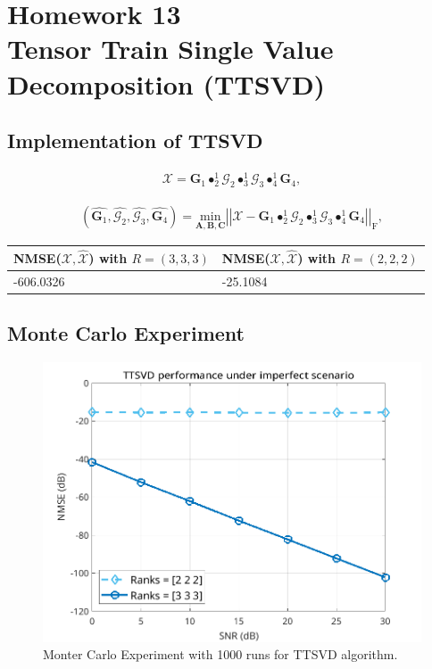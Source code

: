 \documentclass[a4paper,10pt]{article}
\begin{document}
\newpage
\section*{Homework 13 \\ Tensor Train Single Value Decomposition (TTSVD)}

    \subsection*{Implementation of TTSVD}
        
    \begin{align}
        \mathcal{X} = \boldsymbol{G}_{1} \bullet^{1}_{2} \mathcal{G}_{2} \bullet^{1}_{3} \mathcal{G}_{3} \bullet^{1}_{4} \boldsymbol{G}_{4},
    \end{align}

    \begin{align}
        \left(\hat{\boldsymbol{G}_{1}}, \hat{\mathcal{G}_{2}}, \hat{\mathcal{G}_{3}}, \hat{\boldsymbol{G}_{4}}\right) = \underset{\boldsymbol{A}, \boldsymbol{B}, \boldsymbol{C}}{\text{min}} \left| \left| \mathcal{X} - \boldsymbol{G}_{1} \bullet^{1}_{2} \mathcal{G}_{2} \bullet^{1}_{3} \mathcal{G}_{3} \bullet^{1}_{4} \boldsymbol{G}_{4} \right| \right|_{\text{F}},
    \end{align}

    \begin{table}[ht!]
        \centering
        \begin{tabular}{|l|l|}
        \hline
        NMSE($\mathcal{X}, \mathcal{\hat{X}}$) with $R = (3,3,3)$ & NMSE($\mathcal{X}, \mathcal{\hat{X}}$) with $R = (2,2,2)$ \\ \hline 
        -606.0326 & -25.1084 \\ \hline
        \end{tabular}
    \end{table}

    \subsection*{Monte Carlo Experiment}

    \begin{figure}[ht!]
        \centering 
        \includegraphics[width=0.75\linewidth]{figs/hw13.png} \par 
        \caption{Monter Carlo Experiment with 1000 runs for TTSVD algorithm.}
        \label{fig:hw13} 
    \end{figure}

%
%
\end{document}
